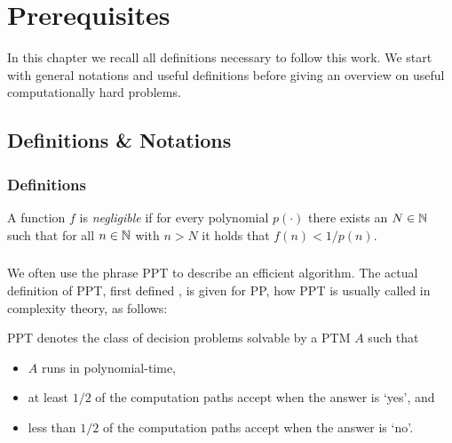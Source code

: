 \chapter{Prerequisites}\label{ch:background}
In this chapter we recall all definitions necessary to follow this work.
We start with general notations and useful definitions before giving an overview on useful computationally hard problems.

\section{Definitions \& Notations}

\subsection{Definitions}

\begin{definition}\label{def:negligible}
A function $f$ is \emph{negligible} if for every polynomial $p(\cdot)$ there exists an $N\in\mathbb{N}$ such that for all $n\in\mathbb{N}$ with $n>N$ it holds that $f(n)<1/p(n)$.
\eod
\end{definition}

\begin{definition}\label{def:asymptotic}
\eod
\end{definition}

\paragraph{}
We often use the phrase \ac{PPT} to describe an efficient algorithm.
The actual definition of \ac{PPT}, first defined \cite{gill1977}, is given for \ac{PP}, how \ac{PPT} is usually called in complexity theory, as follows:

\begin{definition}[\acl{PP}]\label{def:ppt}
\ac{PPT} denotes the class of decision problems solvable by a \ac{PTM} $A$ such that
\begin{itemize}
	\item $A$ runs in polynomial-time,
	\item at least $1/2$ of the computation paths accept when the answer is `yes', and
	\item less than $1/2$ of the computation paths accept when the answer is `no'.
\end{itemize}
\eod
\end{definition}

